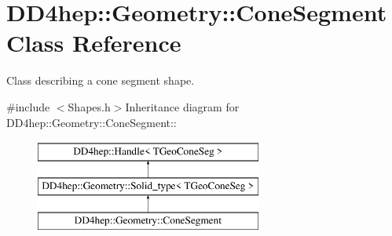 \hypertarget{class_d_d4hep_1_1_geometry_1_1_cone_segment}{
\section{DD4hep::Geometry::ConeSegment Class Reference}
\label{class_d_d4hep_1_1_geometry_1_1_cone_segment}
}


Class describing a cone segment shape.  


{\ttfamily \#include $<$Shapes.h$>$}Inheritance diagram for DD4hep::Geometry::ConeSegment::\begin{figure}[H]
\begin{center}
\leavevmode
\includegraphics[height=3cm]{class_d_d4hep_1_1_geometry_1_1_cone_segment}
\end{center}
\end{figure}
